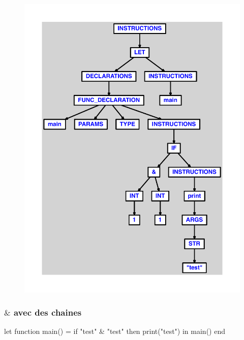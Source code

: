\documentclass{article}
\begin{document}
\begin{figure}[H]\centering\includegraphics[max width=\textwidth]{ast/ast_5.pdf}\end{figure}\subsubsection{$ \& $ avec des chaines}
\begin{verbatimtab}
let
	function main() =
		if "test" & "test" then print("test")
in main() end
\end{verbatimtab}
\end{document}
